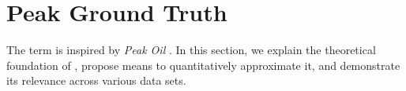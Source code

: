 \section{Peak Ground Truth}
\label{sec:peakgt}
The term  is inspired by \emph{Peak Oil} \cite{hubbert1949energy}.
In this section, we explain the theoretical foundation of , propose means to quantitatively approximate it, and demonstrate its relevance across various  data sets.










